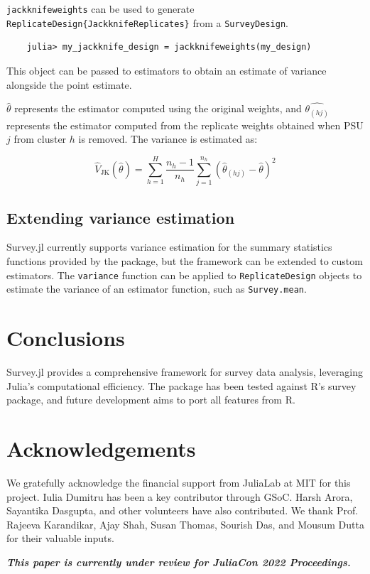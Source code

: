 \documentclass{article}
\begin{document}
\verb|jackknifeweights| can be used to generate \verb|ReplicateDesign{JackknifeReplicates}| from a \verb|SurveyDesign|. 

\begin{verbatim}
    julia> my_jackknife_design = jackknifeweights(my_design)
    \end{verbatim}

This object can be passed to estimators to obtain an estimate of variance alongside the point estimate. 

$\hat{\theta}$ represents the estimator computed using the original weights, and $\hat{\theta_{(hj)}}$ represents the estimator computed from the replicate weights obtained when PSU $j$ from cluster $h$ is removed. The variance is estimated as: 

\begin{equation}
\hat{V}_{\text{JK}}(\hat{\theta}) = \sum_{h = 1}^H \dfrac{n_h - 1}{n_h}\sum_{j = 1}^{n_h}(\hat{\theta}_{(hj)} - \hat{\theta})^2
\end{equation}


\subsection{Extending variance estimation}

Survey.jl currently supports variance estimation for the summary statistics functions provided by the package, but the framework can be extended to custom estimators. The \verb|variance| function can be applied to \verb|ReplicateDesign| objects to estimate the variance of an estimator function, such as \verb|Survey.mean|.

\section{Conclusions}
Survey.jl provides a comprehensive framework for survey data analysis, leveraging Julia's computational efficiency. The package has been tested against R's survey package, and future development aims to port all features from R.

\section{Acknowledgements}
We gratefully acknowledge the financial support from JuliaLab at MIT for this project. Iulia Dumitru has been a key contributor through GSoC. Harsh Arora, Sayantika Dasgupta, and other volunteers have also contributed. We thank Prof. Rajeeva Karandikar, Ajay Shah, Susan Thomas, Sourish Das, and Mousum Dutta for their valuable inputs.





\begin{center}
        \textbf{\textit{This paper is currently under review for JuliaCon 2022 Proceedings.}}
\end{center}
\end{document}
